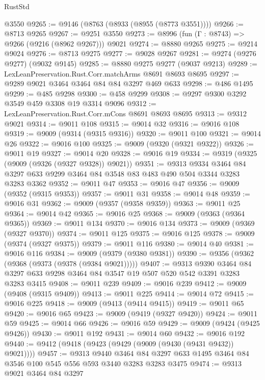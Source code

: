 \begin{lexlean}{RustStd}
\begin{coremodule}
    @3550
@9265 := @9146 (@8763 (@8933 (@8955 (@8773 @3551))))
@9266 := @8713 @9265
@9267 := @9251 @3550
@9273 := @8996 (fun (Γ : @8743) => @9266 (@9216 (@8962 @9267))) @9021
@9274 := @8880 @9265
@9275 := @9214 @9024
@9276 := @8713 @9275
@9277 := @9028 @9267
@9281 := @9274 (@9276 @9277) (@9032 @9145)
@9285 := @8880 @9275 @9277 (@9037 @9213)
@9289 := LexLeanPreservation.Rust.Corr.matchArms @8691 @8693 @8695
@9297 := @9289 @9021 @3464 @3464 @84 @84 @3297 @469 @633
@9298 := @486 @1495
@9299 := @485 @9298
@9300 := @458 @9299
@9308 := @9297 @9300 @3292 @3549 @459 @3308 @19 @3314 @9096
@9312 := LexLeanPreservation.Rust.Corr.mCons @8691 @8693 @8695
@9313 := @9312 @9021
@9314 := @9011 @108
@9315 := @9014 @32
@9316 := @9016 @108
@9319 := @9009 (@9314 (@9315 @9316))
@9320 := @9011 @100
@9321 := @9014 @26
@9322 := @9016 @100
@9325 := @9009 (@9320 (@9321 @9322))
@9326 := @9011 @19
@9327 := @9014 @20
@9328 := @9016 @19
@9334 := @9319 (@9325 (@9009 (@9326 (@9327 @9328)) @9021))
@9351 := @9313
    @9334
    @3464
    @84
    @3297
    @633
    @9299
    @3464
    @84
    @3548
    @83
    @483
    @490
    @504
    @3344
    @3283
    @3283
    @3362
@9352 := @9011 @47
@9353 := @9016 @47
@9356 := @9009 (@9352 (@9315 @9353))
@9357 := @9011 @31
@9358 := @9014 @48
@9359 := @9016 @31
@9362 := @9009 (@9357 (@9358 @9359))
@9363 := @9011 @25
@9364 := @9014 @42
@9365 := @9016 @25
@9368 := @9009 (@9363 (@9364 @9365))
@9369 := @9011 @134
@9370 := @9016 @134
@9373 := @9009 (@9369 (@9327 @9370))
@9374 := @9011 @125
@9375 := @9016 @125
@9378 := @9009 (@9374 (@9327 @9375))
@9379 := @9011 @116
@9380 := @9014 @40
@9381 := @9016 @116
@9384 := @9009 (@9379 (@9380 @9381))
@9390 := @9356 (@9362 (@9368 (@9373 (@9378 (@9384 @9021)))))
@9407 := @9313
    @9390
    @3464
    @84
    @3297
    @633
    @9298
    @3464
    @84
    @3547
    @19
    @507
    @520
    @542
    @3391
    @3283
    @3283
    @3415
@9408 := @9011 @239
@9409 := @9016 @239
@9412 := @9009 (@9408 (@9315 @9409))
@9413 := @9011 @225
@9414 := @9014 @72
@9415 := @9016 @225
@9418 := @9009 (@9413 (@9414 @9415))
@9419 := @9011 @65
@9420 := @9016 @65
@9423 := @9009 (@9419 (@9327 @9420))
@9424 := @9011 @59
@9425 := @9014 @66
@9426 := @9016 @59
@9429 := @9009 (@9424 (@9425 @9426))
@9430 := @9011 @192
@9431 := @9014 @60
@9432 := @9016 @192
@9440 := @9412 (@9418 (@9423 (@9429 (@9009 (@9430 (@9431 @9432)) @9021))))
@9457 := @9313
    @9440
    @3464
    @84
    @3297
    @633
    @1495
    @3464
    @84
    @3546
    @100
    @545
    @556
    @593
    @3440
    @3283
    @3283
    @3475
@9474 := @9313
    @9021
    @3464
    @84
    @3297

\end{coremodule}
\end{lexlean}
